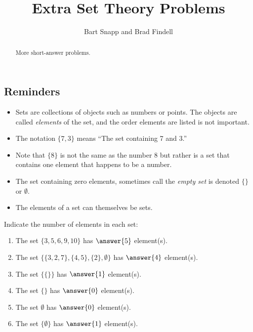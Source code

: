 \documentclass[nooutcomes]{ximera}
\title{Extra Set Theory Problems}
\author{Bart Snapp and Brad Findell}
\begin{document}
\begin{abstract}
More short-answer problems. 
\end{abstract}
\maketitle

\subsection*{Reminders}
\begin{itemize}
\item Sets are collections of objects such as numbers or points.  The objects are called \emph{elements} of the set, and the order elements are listed is not important.  

\item The notation $\{7, 3\}$ means ``The set containing 7 and 3.''  

\item Note that $\{8\}$ is not the same as the number 8 but rather is a set that contains one element that happens to be a number. 

\item The set containing zero elements, sometimes call the \emph{empty set} is denoted $\{\}$ or $\emptyset$.  

\item The elements of a set can themselves be sets.  

\end{itemize}


\begin{problem}
Indicate the number of elements in each set: 
\begin{enumerate}
\item The set $\{3, 5, 6, 9, 10\}$ has $\answer{5}$ element(s).
\item The set $\{ \{3,2,7\}, \{4,5\}, \{2\}, \emptyset \}$ has $\answer{4}$ element(s).
\item The set $\{ \{ \} \}$ has $\answer{1}$ element(s).
\item The set $\{\}$ has $\answer{0}$ element(s).
\item The set $\emptyset$ has $\answer{0}$ element(s).
\item The set $\{ \emptyset \}$ has $\answer{1}$ element(s).
\end{enumerate}

\end{problem}
\end{document}
